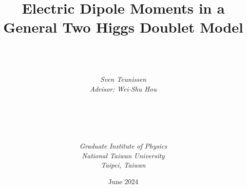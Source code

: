 \documentclass[a4paper, 12pt, twoside, openright]{mythesis}
\begin{document}
\title{\textbf{Electric Dipole Moments in a General Two Higgs Doublet Model}}


\author{ \\  \\ \\
{\it Sven Teunissen}\\
{\it Advisor: Wei-Shu Hou} \\ \\ \\ \\  \\ \\
{\it Graduate Institute of Physics}\\
{\it National Taiwan University} \\
{\it Taipei, Taiwan}\\ }

{\date{June 2024}}

\maketitle

\frontmatter

\tableofcontents
\listoffigures
\listoftables


\mainmatter





% 



% 






\end{document}
